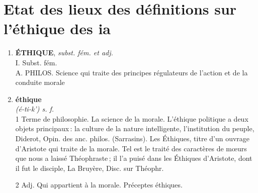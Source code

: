 \section{Etat des lieux des définitions sur l'éthique des \gls{ia}}

\begin{tcolorbox}[title= Définitions françaises de l'éthique du dictionnaire ATILF et Littré]
\begin{enumerate}
\item{
\textbf{ÉTHIQUE}, \textit{subst. fém. et adj.} \\
I. Subst. fém.\\
A. PHILOS. Science qui traite des principes régulateurs de l'action et de la conduite morale
}
\item{
\textbf{éthique} \\
\textit{(é-ti-k') s. f.} \\
1 Terme de philosophie. La science de la morale.
L'éthique politique a deux objets principaux : la culture de la nature intelligente, l'institution du peuple, Diderot, Opin. des anc. philos. (Sarrasins).
Les Éthiques, titre d'un ouvrage d'Aristote qui traite de la morale.
Tel est le traité des caractères de mœurs que nous a laissé Théophraste ; il l'a puisé dans les Éthiques d'Aristote, dont il fut le disciple, La Bruyère, Disc. sur Théophr.

2 Adj. Qui appartient à la morale. Préceptes éthiques.
}
\end{enumerate}
\end{tcolorbox}



\pagebreak
